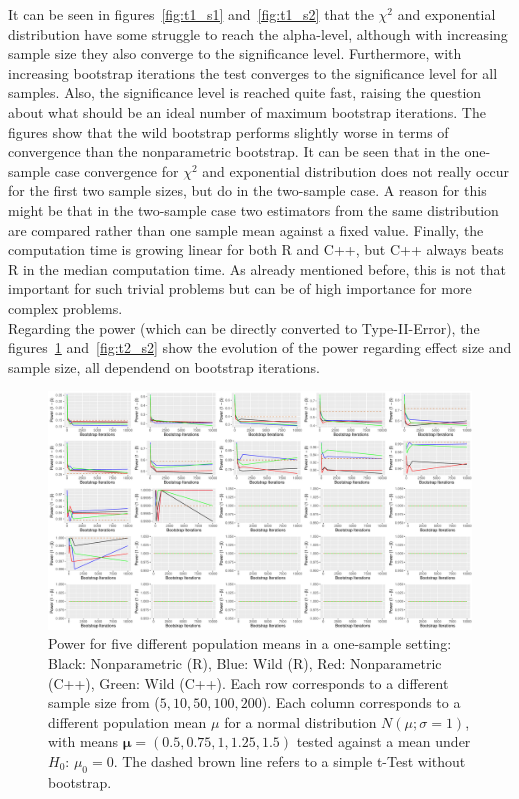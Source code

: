 \noindent It can be seen in figures~\ref{fig:t1_s1} and~\ref{fig:t1_s2} that the $\chi^2$ and exponential distribution have some struggle to reach the alpha-level, although with increasing sample size they also converge to the significance level. Furthermore, with increasing bootstrap iterations the test converges to the significance level for all samples. Also, the significance level is reached quite fast, raising the question about what should be an ideal number of maximum bootstrap iterations. The figures show that the wild bootstrap performs slightly worse in terms of convergence than the nonparametric bootstrap. It can be seen that in the one-sample case convergence for $\chi^2$ and exponential distribution does not really occur for the first two sample sizes, but do in the two-sample case. A reason for this might be that in the two-sample case two estimators from the same distribution are compared rather than one sample mean against a fixed value. Finally, the computation time is growing linear for both R and C++, but C++ always beats R in the median computation time. As already mentioned before, this is not that important for such trivial problems but can be of high importance for more complex problems. \\
Regarding the power (which can be directly converted to Type-II-Error), the figures~\ref{fig:t2_s1} and~\ref{fig:t2_s2} show the evolution of the power regarding effect size and sample size, all dependend on bootstrap iterations. 

\begin{figure}
 \centering
	\includegraphics[scale=0.4]{./figures/plot_t2s1.pdf}
	\caption[Power One Sample]{Power for five different population means in a one-sample setting: Black: Nonparametric (R), Blue: Wild (R), Red: Nonparametric (C++), Green: Wild (C++). Each row corresponds to a different sample size from ($5, 10, 50, 100, 200$). Each column corresponds to a different population mean $\mu$ for a normal distribution $N(\mu; \sigma = 1)$, with means $\mathbf{\mu} = (0.5, 0.75, 1, 1.25, 1.5)$ tested against a mean under $H_0$: $\mu_0 = 0$. The dashed brown line refers to a simple t-Test without bootstrap.}
	\label{fig:t2_s1}
\end{figure}


